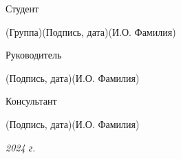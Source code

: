 \documentclass[14pt, russian]{scrartcl}
\begin{document}
\begin{titlepage}
	\vspace{\fill}


	\newlength{\ML}

	\noindent Студент \underline{} \hfill \underline{ \hspace{4cm}}\quad

	\vspace{-2.1ex}
	\noindent\hspace{9ex}\scriptsize{(Группа)}\normalsize\hspace{170pt}\hspace{2ex}\scriptsize{(Подпись, дата)}\normalsize\hspace{30pt}\hspace{6ex}\scriptsize{(И.О. Фамилия)}\normalsize

	\bigskip

	\noindent Руководитель  \hfill \underline{\hspace{4cm}}\quad

	\vspace{-2ex}
	\noindent\hspace{13.5ex}\normalsize\hspace{170pt}\hspace{2ex}\scriptsize{(Подпись, дата)}\normalsize\hspace{30pt}\hspace{6ex}\scriptsize{(И.О. Фамилия)}\normalsize

	\bigskip

	\noindent Консультант\hfill \underline{\hspace{4cm}}\quad
	\underline{\hspace{4cm}}

	\vspace{-2ex}
	\noindent\hspace{13.5ex}\normalsize\hspace{170pt}\hspace{2ex}\scriptsize{(Подпись, дата)}\normalsize\hspace{30pt}\hspace{6ex}\scriptsize{(И.О. Фамилия)}\normalsize
	\vfill




	\begin{center}
		\textsl{2024 г.}
	\end{center}
\end{titlepage}
\end{document}
